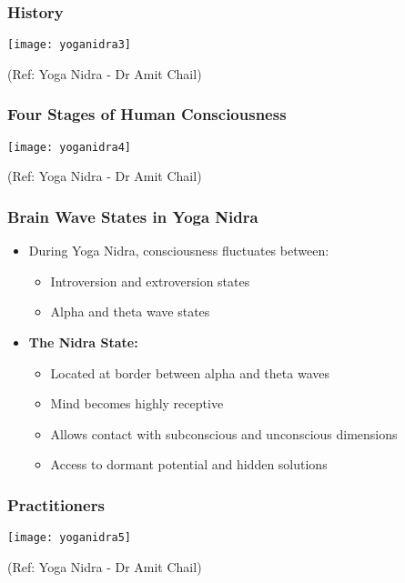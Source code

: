 \begin{frame}[fragile]\frametitle{History}
      \begin{center}
        \texttt{[image: yoganidra3]}

		{\tiny (Ref: Yoga Nidra - Dr Amit Chail)}		
        \end{center}

\end{frame}

\begin{frame}[fragile]\frametitle{Four Stages of Human Consciousness}
      \begin{center}
        \texttt{[image: yoganidra4]}

		{\tiny (Ref: Yoga Nidra - Dr Amit Chail)}		
        \end{center}

\end{frame}

\begin{frame}[fragile]\frametitle{Brain Wave States in Yoga Nidra}
    \begin{itemize}
        \item During Yoga Nidra, consciousness fluctuates between:
        \begin{itemize}
            \item Introversion and extroversion states
            \item Alpha and theta wave states
        \end{itemize}
        \item \textbf{The Nidra State:}
        \begin{itemize}
            \item Located at border between alpha and theta waves
            \item Mind becomes highly receptive
            \item Allows contact with subconscious and unconscious dimensions
            \item Access to dormant potential and hidden solutions
        \end{itemize}
    \end{itemize}
\end{frame}

\begin{frame}[fragile]\frametitle{Practitioners}
      \begin{center}
        \texttt{[image: yoganidra5]}

		{\tiny (Ref: Yoga Nidra - Dr Amit Chail)}		
        \end{center}

\end{frame}

